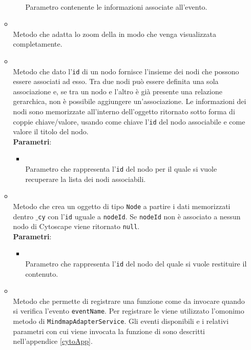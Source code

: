 \begin{itemize}
\begin{itemize}
\begin{itemize}
\\ Parametro contenente le informazioni associate all'evento.
\end{itemize}
\item {}
\\ Metodo che adatta lo zoom della  in modo che venga visualizzata completamente.
\item {}
\\ Metodo che dato l'\texttt{id} di un nodo fornisce l'insieme dei nodi che possono essere associati ad esso.
Tra due nodi può essere definita una sola associazione e, se tra un nodo e l'altro è già presente una relazione gerarchica, non è possibile aggiungere un'associazione. Le informazioni dei nodi sono memorizzate all'interno dell'oggetto ritornato sotto forma di coppie chiave/valore, usando come chiave l'\texttt{id} del nodo associabile e come valore il titolo del nodo.
\\ \textbf{Parametri}:
\begin{itemize}
\item {}
\\ Parametro che rappresenta l'\texttt{id} del nodo per il quale si vuole recuperare la lista dei nodi associabili.
\end{itemize}
\item {}
\\ Metodo che crea un oggetto di tipo \texttt{Node} a partire i dati memorizzati dentro \texttt{$\_$cy} con l'\texttt{id} uguale a \texttt{nodeId}. Se \texttt{nodeId} non è associato a nessun nodo di Cytoscape viene ritornato \texttt{null}.
\\ \textbf{Parametri}:
\begin{itemize}
\item {}
\\ Parametro che rappresenta l'\texttt{id} del nodo del quale si vuole restituire il contenuto.
\end{itemize}
\item {}
\\ Metodo che permette di registrare una funzione come  da invocare quando si verifica l'evento \texttt{eventName}. Per registrare le  viene utilizzato l'omonimo metodo di \texttt{MindmapAdapterService}.
Gli eventi disponibili e i relativi parametri con cui viene invocata la funzione di  sono descritti nell'appendice \ref{cytoApp}.

\end{itemize}
\end{itemize}
